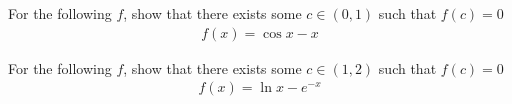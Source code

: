 \begin{exercise}
For the following $f$, show that there exists some $c \in (0, 1)$ such that $f(c)=0$
\begin{align*}
    f(x) = \cos x - x
\end{align*}
\end{exercise}

\begin{exercise}
For the following $f$, show that there exists some $c \in (1, 2)$ such that $f(c)=0$
\begin{align*}
    f(x) = \ln x - e^{-x}
\end{align*}
\end{exercise}